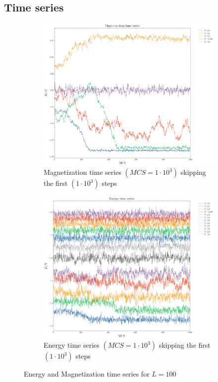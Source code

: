 \documentclass[article]{revtex4}
\begin{document}
\subsection{Time series}
\begin{figure}[h!]
\begin{subfigure}{.5\textwidth}
  \centering
  \includegraphics[width=1\linewidth]{M_vs_steps10e3.png}
  \caption{Magnetization time series $ (MCS = 1 \cdot10^{3})$ skipping the first $(1 \cdot10^{3})$ steps}
\end{subfigure}%
\begin{subfigure}{.5\textwidth}
  \centering
  \includegraphics[width=1\linewidth]{E_vs_steps10e3.png}
  \caption{Energy time series $ (MCS = 1 \cdot10^{3})$ skipping the first $(1 \cdot10^{3})$ steps}
\end{subfigure}
\caption{Energy and Magnetization time series for $L = 100$}
\end{figure}
\end{document}
